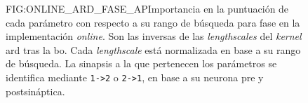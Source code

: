 \begin{figure}[Importancia en la puntuación de los parámetros de la \acl{bo} \textit{online} en fase]{FIG:ONLINE_ARD_FASE_AP}{Importancia en la puntuación de cada parámetro con respecto a su rango de búsqueda para fase en la implementación \textit{online}. Son las inversas de las \textit{lengthscales} del \textit{kernel} \ac{ard} tras la \ac{bo}. Cada \textit{lengthscale} está normalizada en base a su rango de búsqueda. La sinapsis a la que pertenecen los parámetros se identifica mediante \texttt{1->2} o \texttt{2->1}, en base a su neurona pre y postsináptica.}
\end{figure}
